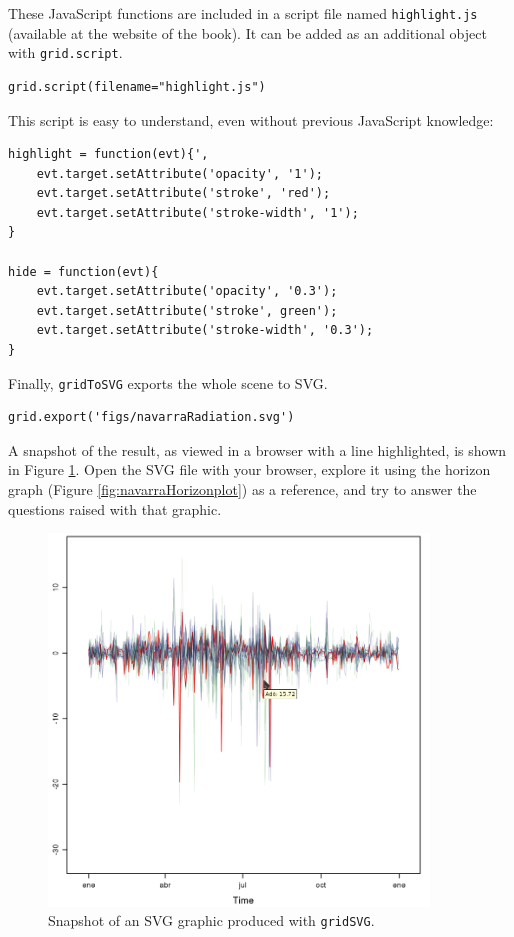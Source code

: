 These JavaScript functions are included in a script file named
\texttt{highlight.js} (available at the website of the book). It can be
added as an additional object with \texttt{grid.script}.


\lstset{language=R,numbers=none}
\begin{lstlisting}
grid.script(filename="highlight.js")
\end{lstlisting}

This script is easy to understand, even without previous
JavaScript knowledge:
\begin{verbatim}
highlight = function(evt){',
    evt.target.setAttribute('opacity', '1');
    evt.target.setAttribute('stroke', 'red');
    evt.target.setAttribute('stroke-width', '1');
}

hide = function(evt){
    evt.target.setAttribute('opacity', '0.3');
    evt.target.setAttribute('stroke', green');
    evt.target.setAttribute('stroke-width', '0.3');
}
\end{verbatim}

Finally, \texttt{gridToSVG} exports the whole scene to SVG. 

\lstset{language=R,numbers=none}
\begin{lstlisting}
grid.export('figs/navarraRadiation.svg')
\end{lstlisting}

A snapshot of the result, as viewed in a browser with a line
highlighted, is shown in Figure \ref{fig:navarraSVG}. Open the SVG
file with your browser, explore it using the horizon graph (Figure
\ref{fig:navarraHorizonplot}) as a reference, and try to answer the
questions raised with that graphic.

\begin{figure}
  \centering
  \includegraphics[width=0.9\textwidth]{figs/navarraSVG_captura.png}
  \caption{\label{fig:navarraSVG}Snapshot of an SVG graphic produced with \texttt{gridSVG}.}
\end{figure}



